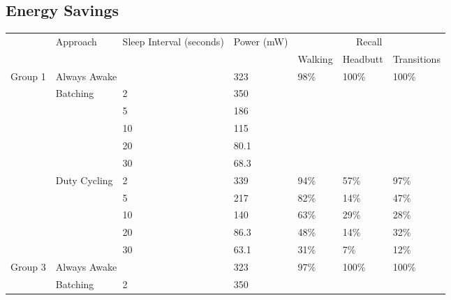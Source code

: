 
\subsection{Energy Savings}

\begin{table*}[t]
    \begin{tabular}{|l|l|l|l|l|l|l|}
    \hline
	\multirow{2}{*}{~}			& \multirow{2}{*}{Approach}		& \multirow{2}{*}{\parbox{2.2cm}{Sleep Interval (seconds)}}	
																			& \multirow{2}{*}{\parbox{1.2cm}{Power (mW)}} 
																						& \multicolumn{3}{c|}{Recall} 													\\ \cline{5-7}
								&								&			&			& Walking				& Headbutt					& Transitions 				\\ \hline
	\multirow{11}{*}{Group 1}	& \multicolumn{2}{l|}{Always Awake}			& 323		& \multirow{6}{*}{98\%}	& \multirow{6}{*}{100\%}	& \multirow{6}{*}{100\%}	\\ \cline{2-4}
								& \multirow{5}{*}{Batching}		& 2			& 350		&						&							&							\\ \cline{3-4}
								& 								& 5			& 186		&						&							&							\\ \cline{3-4}
								& 								& 10		& 115		&						&							&							\\ \cline{3-4}
								& 								& 20		& 80.1		&						&							&							\\ \cline{3-4}
								& 								& 30		& 68.3		&						&							&							\\ \cline{2-7}
								& \multirow{5}{*}{Duty Cycling}	& 2			& 339		& 94\%					& 57\%						& 97\%						\\ \cline{3-7}
								& 								& 5			& 217		& 82\%					& 14\%						& 47\%						\\ \cline{3-7}
								& 								& 10		& 140		& 63\%					& 29\%						& 28\%						\\ \cline{3-7}
								& 								& 20		& 86.3		& 48\%					& 14\%						& 32\%						\\ \cline{3-7}
								& 								& 30		& 63.1		& 31\%					& 7\%						& 12\%						\\ \hline
	\multirow{11}{*}{Group 3}	& \multicolumn{2}{l|}{Always Awake}			& 323		& \multirow{6}{*}{97\%}	& \multirow{6}{*}{100\%}	& \multirow{6}{*}{100\%}	\\ \cline{2-4}
								& \multirow{5}{*}{Batching}		& 2			& 350		&						&							&							\\ \cline{3-4}

\end{tabular}
\end{table*}
